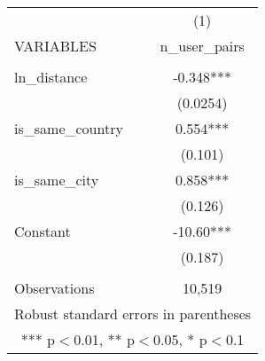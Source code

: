 \begin{tabular}{lc} \hline
 & (1) \\
VARIABLES & n\_user\_pairs \\ \hline
 &  \\
ln\_distance & -0.348*** \\
 & (0.0254) \\
is\_same\_country & 0.554*** \\
 & (0.101) \\
is\_same\_city & 0.858*** \\
 & (0.126) \\
Constant & -10.60*** \\
 & (0.187) \\
 &  \\
 Observations & 10,519 \\ \hline
\multicolumn{2}{c}{ Robust standard errors in parentheses} \\
\multicolumn{2}{c}{ *** p$<$0.01, ** p$<$0.05, * p$<$0.1} \\
\end{tabular}
